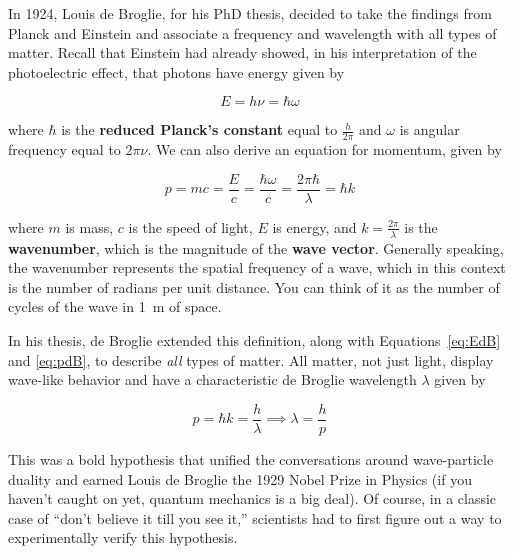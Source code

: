 In 1924, Louis de Broglie, for his PhD thesis, decided to take the findings from Planck and Einstein and associate a frequency and wavelength with all types of matter. Recall that Einstein had already showed, in his interpretation of the photoelectric effect, that photons have energy given by
\begin{tcolorbox}[title=Energy relationship] \vspace{-2ex}
	\begin{equation}
		E = h\nu = \hbar \omega \label{eq:EdB}
	\end{equation}
\end{tcolorbox}

where $\hbar$ is the \textbf{reduced Planck's constant} equal to $\frac{h}{2\pi}$ and $\omega$ is angular frequency equal to $2\pi\nu$. We can also derive an equation for momentum, given by
\begin{tcolorbox}[title=Momentum relationship] \vspace{-2ex}
	\begin{equation}
		p = mc = \frac{E}{c} = \frac{\hbar\omega}{c} = \frac{2\pi\hbar}{\lambda} = \hbar k \label{eq:pdB}
	\end{equation}
\end{tcolorbox}

where $m$ is mass, $c$ is the speed of light, $E$ is energy, and $k=\frac{2\pi}{\lambda}$ is the \textbf{wavenumber}, which is the magnitude of the \textbf{wave vector}. Generally speaking, the wavenumber represents the spatial frequency of a wave, which in this context is the number of radians per unit distance. You can think of it as the number of cycles of the wave in \SI{1}{\meter} of space. \par

In his thesis, de Broglie extended this definition, along with Equations~\ref{eq:EdB} and \ref{eq:pdB}, to describe \emph{all} types of matter. All matter, not just light, display wave-like behavior and have a characteristic de Broglie wavelength $\lambda$ given by
\begin{tcolorbox}[title=de Broglie wavelength] \vspace{-2ex}
	\begin{equation}
		p = \hbar k = \frac{h}{\lambda} \implies \lambda = \frac{h}{p} \label{dBw}
	\end{equation}
\end{tcolorbox}

This was a bold hypothesis that unified the conversations around wave-particle duality and earned Louis de Broglie the 1929 Nobel Prize in Physics (if you haven't caught on yet, quantum mechanics is a big deal). Of course, in a classic case of ``don't believe it till you see it,'' scientists had to first figure out a way to experimentally verify this hypothesis.

